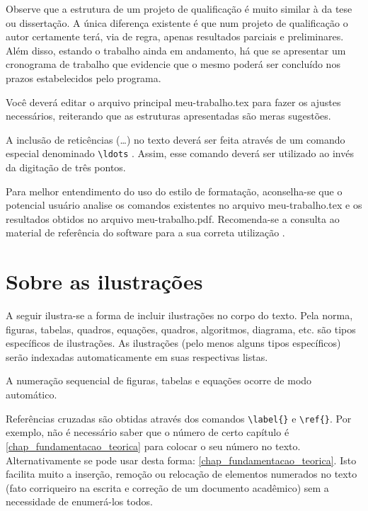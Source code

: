 \begin{apendicesenv}
    \newpage

    Observe que a estrutura de um projeto de qualificação é muito similar à da tese ou dissertação.
    A única diferença existente é que num projeto de qualificação o autor certamente terá, via de regra, apenas resultados parciais e preliminares.
    Além disso, estando o trabalho ainda em andamento, há que se apresentar um cronograma de trabalho que evidencie que o mesmo poderá ser concluído nos prazos estabelecidos pelo programa.

    Você deverá editar o arquivo principal {\color{red} meu-trabalho.tex} para fazer os ajustes necessários, reiterando que as estruturas apresentadas são meras sugestões.

    A inclusão de reticências (\ldots) no texto deverá ser feita através de um comando especial denominado \verb|\ldots| \cite{LaTeX2014}.
    Assim, esse comando deverá ser utilizado ao invés da digitação de três pontos.

    Para melhor entendimento do uso do estilo de formatação, aconselha-se que o potencial usuário analise os comandos existentes no arquivo {\color{red} meu-trabalho.tex} e os resultados obtidos no arquivo {\color{red} meu-trabalho.pdf}.
    Recomenda-se a consulta ao material de referência do software para a sua correta utilização \cite{Lamport1986,Buerger1989,Kopka2003,Mittelbach2004}.


    \chapter{Sobre as ilustrações}
    \label{chap_sobre_as_ilustracoes}

    A seguir ilustra-se a forma de incluir ilustrações no corpo do texto.
    Pela norma, figuras, tabelas, quadros, equações, quadros, algoritmos, diagrama, etc.
    são tipos específicos de ilustrações.
    As ilustrações (pelo menos alguns tipos específicos) serão indexadas automaticamente em suas respectivas listas.

    A numeração sequencial de figuras, tabelas e equações ocorre de modo automático.

    Referências cruzadas são obtidas através dos comandos \verb|\label{}| e \verb|\ref{}|.
    Por exemplo, não é necessário saber que o número de certo capítulo é \ref{chap_fundamentacao_teorica} para colocar o seu número no texto.
    Alternativamente se pode usar desta forma: \autoref{chap_fundamentacao_teorica}.
    Isto facilita muito a inserção, remoção ou relocação de elementos numerados no texto (fato corriqueiro na escrita e correção de um documento acadêmico) sem a necessidade de enumerá-los todos.


\end{apendicesenv}
